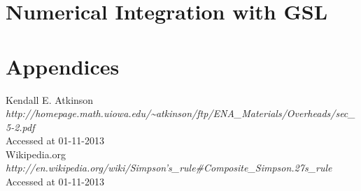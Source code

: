 \documentclass[pdf,color]{UoBnote}
\begin{document}
				
\section{Numerical Integration with GSL}

\section{Appendices}

\begin{thebibliography}{breitestes Label}
	 Kendall E. Atkinson\\{\em http://homepage.math.uiowa.edu/\textasciitilde{}atkinson/ftp/ENA\_Materials/Overheads/sec\_5-2.pdf}\\Accessed at 01-11-2013\\
	 Wikipedia.org\\{\em http://en.wikipedia.org/wiki/Simpson's\_rule\#Composite\_Simpson.27s\_rule}\\Accessed at 01-11-2013
\end{thebibliography}
\end{document}
